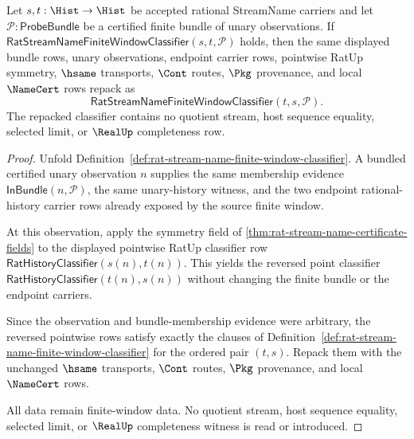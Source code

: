 \begin{theorem}
\label{thm:streamname-finite-window-pointwise-symmetry}
Let $s,t:\Hist\to\Hist$ be accepted rational StreamName carriers and let
$\mathcal{P}:\mathsf{ProbeBundle}$ be a certified finite bundle of unary
observations. If
$\mathsf{RatStreamNameFiniteWindowClassifier}(s,t,\mathcal{P})$ holds, then
the same displayed bundle rows, unary observations, endpoint carrier rows,
pointwise RatUp symmetry, $\hsame$ transports, $\Cont$ routes, $\Pkg$
provenance, and local $\NameCert$ rows repack as
$$
\mathsf{RatStreamNameFiniteWindowClassifier}(t,s,\mathcal{P}).
$$
The repacked classifier contains no quotient stream, host sequence equality,
selected limit, or $\RealUp$ completeness row.
\end{theorem}
\begin{proof}
Unfold Definition~\ref{def:rat-stream-name-finite-window-classifier}. A
bundled certified unary observation $n$ supplies the same membership evidence
$\mathsf{InBundle}(n,\mathcal{P})$, the same unary-history witness, and the two
endpoint rational-history carrier rows already exposed by the source finite
window.

At this observation, apply the symmetry field of
\autoref{thm:rat-stream-name-certificate-fields} to the displayed pointwise
RatUp classifier row
$\mathsf{RatHistoryClassifier}(s(n),t(n))$. This yields the reversed point
classifier $\mathsf{RatHistoryClassifier}(t(n),s(n))$ without changing the
finite bundle or the endpoint carriers.

Since the observation and bundle-membership evidence were arbitrary, the
reversed pointwise rows satisfy exactly the clauses of
Definition~\ref{def:rat-stream-name-finite-window-classifier} for the ordered
pair $(t,s)$. Repack them with the unchanged $\hsame$ transports, $\Cont$
routes, $\Pkg$ provenance, and local $\NameCert$ rows.

All data remain finite-window data. No quotient stream, host sequence equality,
selected limit, or $\RealUp$ completeness witness is read or introduced.
\end{proof}

